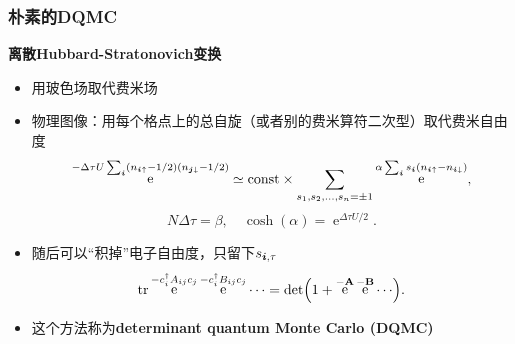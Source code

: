 \documentclass[UTF8]{ctexbeamer}
\DeclareMathOperator{\ee}{e}
\newcommand{\concept}[1]{\textbf{#1}}
\begin{document}
\begin{frame}
\frametitle{朴素的DQMC}

\concept{离散Hubbard-Stratonovich变换}
\begin{itemize}
    \item 用玻色场取代费米场
    \item 物理图像：用每个格点上的总自旋（或者别的费米算符二次型）取代费米自由度
    \begin{equation}
        \ee^{-\Delta \tau U \sum_{\vb*{i}} (n_{\vb*{i} \uparrow} - 1/2) (n_{\vb*{j} \downarrow} - 1/2)} \simeq \text{const} \times \sum_{s_1, s_2, \ldots, s_n = \pm 1} \ee^{\alpha \sum_{\vb*{i}} s_{\vb*{i}} ({n}_{\vb*{i} \uparrow} - {n}_{\vb*{i} \downarrow})},
    \end{equation}
    \begin{equation}
        N \Delta \tau = \beta, \quad \cosh(\alpha) = \ee^{\Delta \tau U / 2}.
    \end{equation}
    \item 随后可以“积掉”电子自由度，只留下$s_{\vb*{i}, \tau}$
    \begin{equation}
        \trace \ee^{- c^\dagger_i A_{ij} c_j} \ee^{- c^\dagger_i B_{ij} c_j} \cdots = \det(1 + \ee^{- \vb{A}} \ee^{- \vb{B}} \cdots).
    \end{equation}
    \item 这个方法称为\concept{determinant quantum Monte Carlo (DQMC)}
\end{itemize}

\end{frame}
\end{document}
